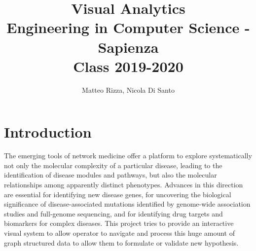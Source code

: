\documentclass[12pt,twocolumn,twoside]{article}
\begin{document}
	
	\title{Visual Analytics \\
		\large Engineering in Computer Science - Sapienza\\ Class 2019-2020}
	
	
	\author{Matteo Rizza, Nicola Di Santo}

 

\section*{Introduction}
The emerging tools of network medicine offer a platform to explore systematically not only the molecular complexity of a particular disease, leading to the identification of disease modules and pathways, but also the molecular relationships among apparently distinct phenotypes. Advances in this direction are essential for identifying new disease genes, for uncovering the biological significance of disease-associated mutations identified by genome-wide association studies and full-genome sequencing, and for identifying drug targets and biomarkers for complex diseases. This project tries to provide an interactive visual system to allow operator to navigate and process this huge amount of graph structured data to allow them to formulate or validate new hypothesis.\\ %
\end{document}
